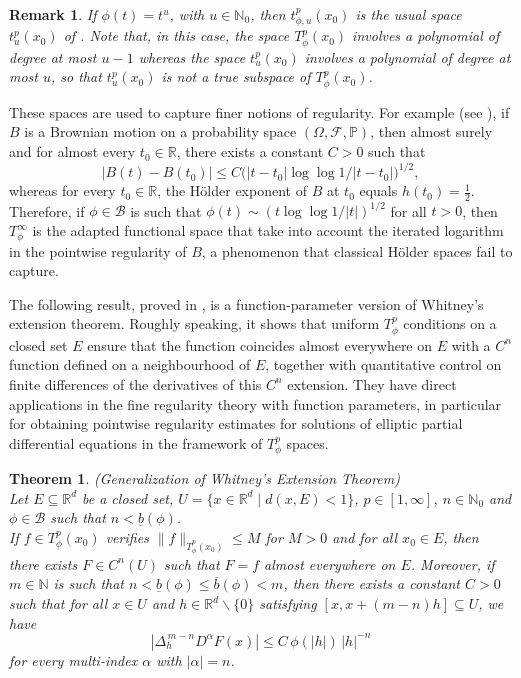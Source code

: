 \documentclass[a4paper,10pt]{article}
\theoremstyle{thmstyleone}%
\newtheorem{theorem}{Theorem}%
\theoremstyle{thmstyletwo}%
\newtheorem{remark}{Remark}%
\theoremstyle{thmstylethree}%
\begin{document}
\begin{remark}
If $\phi(t)=t^u$, with $u \in \mathbb{N}_0$, then $t^p_{\phi,u}(x_0)$ is the usual space $t^p_u(x_0)$ of \cite{Ziemer:89}. 
Note that, in this case, the space $T^p_\phi(x_0)$ involves a polynomial of degree at most $u-1$ whereas the space $t^p_u(x_0)$ involves a polynomial of degree at most $u$, so that $t^p_u(x_0)$ is not a true subspace of $T^p_\phi(x_0)$.
\end{remark}

 These spaces are used to capture finer notions of regularity. For example (see \cite{Morters:10}), if $B$ is a Brownian motion on a probability space $(\Omega, \mathcal{F}, \mathbb{P})$, then almost surely and for almost every $t_0 \in \mathbb{R}$, there exists a constant $C > 0$ such that
\begin{equation}\label{equa Brownien}
|B(t) - B(t_0)| \leq C \big(|t - t_0| \log \log 1/|t - t_0|\big)^{1/2},
\end{equation}
whereas for every $t_0 \in \mathbb{R}$, the H\"older exponent of $B$ at $t_0$ equals $h(t_0) = \frac{1}{2}$. Therefore, if $\phi\in\mathcal{B}$ is such that $\phi(t)\sim (t \log \log 1/|t|)^{1/2}$ for all $t>0$, then $T^\infty_\phi$ is the adapted functional space that take into account the iterated logarithm in the pointwise regularity of $B$, a phenomenon that classical H\"older spaces fail to capture.

 \medskip
\noindent
The following result, proved in \cite{Loosveldt:20}, is a function-parameter 
version of Whitney's extension theorem. Roughly speaking, it shows that 
uniform $T^p_\phi$ conditions on a closed set $E$ ensure that the function 
coincides almost everywhere on $E$ with a $C^n$ function defined on a 
neighbourhood of $E$, together with quantitative control on finite differences 
of the derivatives of this $C^n$ extension. They have direct 
applications in the fine regularity theory with function parameters, in 
particular for obtaining pointwise regularity estimates for solutions of 
elliptic partial differential equations in the framework of $T^p_\phi$ spaces.

\begin{theorem}\label{Gen Whitney}\emph{(Generalization of Whitney's Extension Theorem)}
\\Let $E\subseteq \mathbb{R}^d$ be a closed set, $U=\{x\in\mathbb{R}^d\mid d(x,E)<1\}$, $p\in [1,\infty]$, $n\in\mathbb{N}_0$ and $\phi\in\mathcal{B}$ such that $n<\underline{b}(\phi)$.
\\If $f\in T^p_\phi(x_0)$ verifies $\|f\|_{T^p_\phi(x_0)}\leq M$ for $M>0$ and for all $x_0\in E$, then there exists $F\in C^n(U)$ such that $F=f$ almost everywhere on $E$. Moreover, if $m \in \mathbb{N}$ is such that $n < \underline{b}(\phi) \leq \overline{b}(\phi) < m$, then there exists a constant $C > 0$ such that for all $x \in U$ and $h \in \mathbb{R}^d\backslash\{0\}$ satisfying $[x, x + (m-n)h]\subseteq U$, we have
\[
|\Delta^{\,m-n}_h D^\alpha F(x)| \leq C \, \phi(|h|) \, |h|^{-n}
\]
for every multi-index $\alpha$ with $|\alpha| = n$.

\end{theorem}
 
\end{document}
